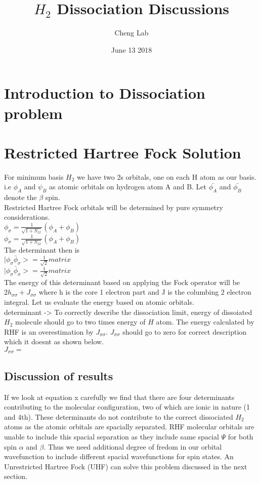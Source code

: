 \documentclass[11pt]{article}   	%
\begin{document}
\title{$H_2$ Dissociation Discussions}
\author{Cheng Lab}
\date{June 13 2018}							%
\maketitle
\section{Introduction to Dissociation problem}
\section{Restricted Hartree Fock Solution}
	For minimum basis $H_2$ we have two 2s orbitals, one on each H atom as our basis.
	i.e $\phi_A$ and $\psi_B$ as atomic orbitals on hydrogen atom A and B. Let $\bar{\phi_A}$ and $\bar{\phi_B}$
	denote the $\beta$ spin. \\
	Restricted Hartree Fock orbitals will be determined by pure symmetry considerations.\\ 
	$\phi_{\sigma}=\frac{1}{\sqrt{1+S_{12}}}(\phi_A+\phi_B)$\\	
	$\phi_{\sigma}=\frac{1}{\sqrt{1+S_{12}}}(\phi_A+\phi_B)$\\
	The determinant then is\\
	$|\phi_{\sigma}\bar{\phi}_{\sigma}>=\frac{1}{\sqrt{2}}matrix$\\
	$|\phi_{\sigma}\bar{\phi}_{\sigma}>=\frac{1}{\sqrt{2}}matrix$\\
	The energy of this determinant based on applying the Fock operator will be $2h_{\sigma \sigma} + J_{\sigma \sigma}$
	where h is the core 1 electron part and J is the columbing 2 electron integral. Let us evaluate the energy based on atomic orbitals.\\
	determinant ->
	To correctly describe the dissociation limit, energy of dissoiated $H_2$ molecule should go to two times energy of $H$ atom. The energy calculated by RHF is an overestimation by $J_{\sigma \sigma}$. 
	$J_{\sigma \sigma}$ should go to zero for correct description which it doesnt as shown below. \\
	$J_{\sigma \sigma}=$\\
	
	\subsection{Discussion of results}
	If we look at equation x carefully we find that there are four determinants contributing to the molecular configuration, two of which are ionic in nature (1 and 4th). 
	These determinants do not contribute to the correct dissociated $H_2$ atoms as the atomic orbitals are spacially separated. RHF molecular orbitals are unable to include this spacial separation as they 
	include same spacial $\Psi$ for both spin $\alpha$ and $\beta$. Thus we need additional degree of fredom in our orbital wavefunction to include different spacial wavefunctions for spin states. An Unrestricted 
	Hartree Fock (UHF) can solve this problem discussed in the next section. \\
\end{document}
